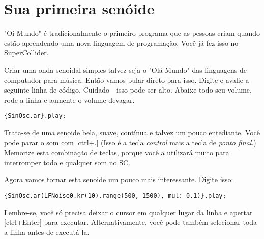 \section{Sua primeira senóide \label{sec:first-sine}}


"Oi Mundo" é tradicionalmente o primeiro programa que as pessoas criam quando estão aprendendo uma nova linguagem de programação. Você já fez isso no SuperCollider.

Criar uma onda senoidal simples talvez seja o "Olá Mundo" das linguagens de computador para música. Então vamos pular direto para isso. Digite e avalie a seguinte linha de código. Cuidado---isso pode ser alto. Abaixe todo seu volume, rode a linha e aumente o volume devagar.
 
\begin{lstlisting}[style=SuperCollider-IDE, basicstyle=\scttfamily\footnotesize]
{SinOsc.ar}.play;
\end{lstlisting}
 

Trata-se de uma senoide bela, suave, contínua e talvez um pouco entediante. Você pode parar o som com [ctrl+.] (Isso é a tecla \emph{control} mais a tecla de \emph{ponto final}.) Memorize esta combinação de teclas, porque você a utilizará muito para interromper todo e qualquer som no SC.

\bigskip
{}
\bigskip

Agora vamos tornar esta senoide um pouco mais interessante. Digite isso:

 
\begin{lstlisting}[style=SuperCollider-IDE, basicstyle=\scttfamily\footnotesize ]
{SinOsc.ar(LFNoise0.kr(10).range(500, 1500), mul: 0.1)}.play;
\end{lstlisting}
 

Lembre-se, você só precisa deixar o cursor em qualquer lugar da linha e apertar [ctrl+Enter] para executar. Alternativamente, você pode também selecionar toda a linha antes de executá-la.

 
\bigskip
{}
